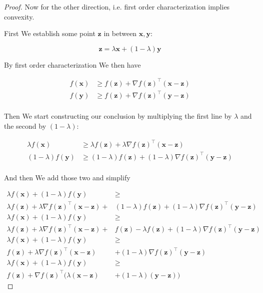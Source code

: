 \documentclass{article}
\begin{document}
		\begin{proof}
			Now for the other direction, i.e. first order characterization implies convexity.
			
			First We establish some point $\mathbf{z}$ in between $\mathbf{x, y}$:
			
			\[ \mathbf{z} = \lambda \mathbf{x} + (1-\lambda)\mathbf{y} \]
			
			By first order characterization We then have
			
			\begin{align*}
				f(\mathbf{x}) &\ge f(\mathbf{z}) + \nabla f(\mathbf{z})^\top (\mathbf{x-z})\\
				f(\mathbf{y}) &\ge f(\mathbf{z}) + \nabla f(\mathbf{z})^\top (\mathbf{y-z})\\
			\end{align*}
			
			Then We start constructing our conclusion by multiplying the first line by $\lambda$ and the second by $(1-\lambda)$:
			
			\begin{align*}
				\lambda f(\mathbf{x}) &\ge \lambda f(\mathbf{z}) + \lambda \nabla f(\mathbf{z})^\top (\mathbf{x-z})\\
				(1-\lambda) f(\mathbf{y}) &\ge (1-\lambda) f(\mathbf{z}) + (1-\lambda) \nabla f(\mathbf{z})^\top (\mathbf{y-z})\\
			\end{align*}
			
			And then We add those two and simplify
			
			\begin{align*}
				\lambda f(\mathbf{x}) + (1-\lambda) f(\mathbf{y}) &\ge \\ 
				\lambda f(\mathbf{z}) + \lambda \nabla f(\mathbf{z})^\top (\mathbf{x-z}) + &(1-\lambda) f(\mathbf{z}) + (1-\lambda) \nabla f(\mathbf{z})^\top (\mathbf{y-z})\\
				\lambda f(\mathbf{x}) + (1-\lambda) f(\mathbf{y}) &\ge \\ 
				\lambda f(\mathbf{z}) + \lambda \nabla f(\mathbf{z})^\top (\mathbf{x-z}) + & f(\mathbf{z}) -\lambda f(\mathbf{z}) + (1-\lambda) \nabla f(\mathbf{z})^\top (\mathbf{y-z})\\
				\lambda f(\mathbf{x}) + (1-\lambda) f(\mathbf{y}) &\ge \\ 
				f(\mathbf{z}) + \lambda \nabla f(\mathbf{z})^\top (\mathbf{x-z}) &+ (1-\lambda) \nabla f(\mathbf{z})^\top (\mathbf{y-z})\\
				\lambda f(\mathbf{x}) + (1-\lambda) f(\mathbf{y}) &\ge \\ 
				f(\mathbf{z}) +  \nabla f(\mathbf{z})^\top \bigg( \lambda (\mathbf{x-z}) &+ (1-\lambda)(\mathbf{y-z})\bigg)
			\end{align*}
			

\end{proof}
\end{document}
